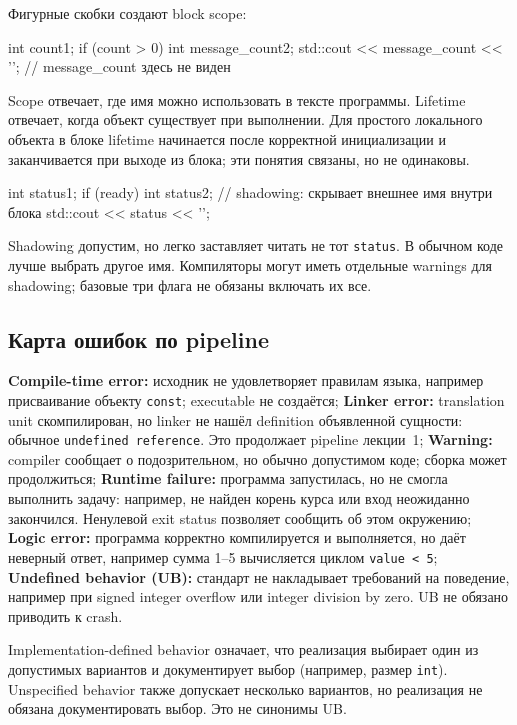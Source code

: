 Фигурные скобки создают block scope:

\begin{cppcode}
int count{1};
if (count > 0) {
    int message_count{2};
    std::cout << message_count << '\n';
}
// message_count здесь не виден
\end{cppcode}

Scope отвечает, где имя можно использовать в тексте программы. Lifetime
отвечает, когда объект существует при выполнении. Для простого локального
объекта в блоке lifetime начинается после корректной инициализации и
заканчивается при выходе из блока; эти понятия связаны, но не одинаковы.

\begin{cppcode}
int status{1};
if (ready) {
    int status{2}; // shadowing: скрывает внешнее имя внутри блока
    std::cout << status << '\n';
}
\end{cppcode}

Shadowing допустим, но легко заставляет читать не тот \texttt{status}. В
обычном коде лучше выбрать другое имя. Компиляторы могут иметь отдельные
warnings для shadowing; базовые три флага не обязаны включать их все.

\subsection{Карта ошибок по pipeline}

\textbf{Compile-time error:} исходник не удовлетворяет правилам языка, например присваивание объекту \texttt{const}; executable не создаётся; \textbf{Linker error:} translation unit скомпилирован, но linker не нашёл definition объявленной сущности: обычное \texttt{undefined reference}. Это продолжает pipeline лекции~1; \textbf{Warning:} compiler сообщает о подозрительном, но обычно допустимом коде; сборка может продолжиться; \textbf{Runtime failure:} программа запустилась, но не смогла выполнить задачу: например, не найден корень курса или вход неожиданно закончился. Ненулевой exit status позволяет сообщить об этом окружению; \textbf{Logic error:} программа корректно компилируется и выполняется, но даёт неверный ответ, например сумма 1--5 вычисляется циклом \texttt{value < 5}; \textbf{Undefined behavior (UB):} стандарт не накладывает требований на поведение, например при signed integer overflow или integer division by zero. UB не обязано приводить к crash.

Implementation-defined behavior означает, что реализация выбирает один из
допустимых вариантов и документирует выбор (например, размер \texttt{int}).
Unspecified behavior также допускает несколько вариантов, но реализация не
обязана документировать выбор. Это не синонимы UB.

